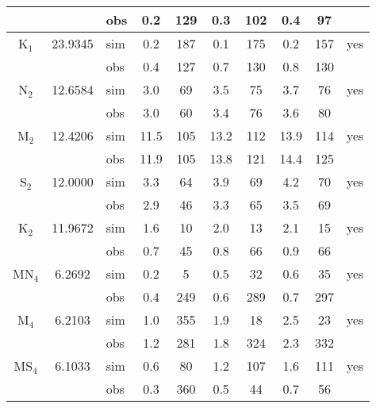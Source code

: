 \begin{table}[htb]
\begin{tabular}{|c|c|l|cc|cc|cc|c|}
\small      &        	     & \small obs & \small 0.2  & \small 129 & \small 0.3  & \small 102 & \small 0.4  & \small 97  &    	\\
\hline
\small K$_1$& \small 23.9345 & \small sim & \small 0.2  & \small 187 & \small 0.1  & \small 175 & \small 0.2  & \small 157 & \small yes	\\
\small      &        	     & \small obs & \small 0.4  & \small 127 & \small 0.7  & \small 130 & \small 0.8  & \small 130 &    	\\
\hline
\small N$_2$& \small 12.6584 & \small sim & \small 3.0  & \small 69  & \small 3.5  & \small 75  & \small 3.7  & \small 76  & \small yes	\\
\small      &        	     & \small obs & \small 3.0  & \small 60  & \small 3.4  & \small 76  & \small 3.6  & \small 80  &    	\\
\hline
\small M$_2$& \small 12.4206 & \small sim & \small 11.5 & \small 105 & \small 13.2 & \small 112 & \small 13.9 & \small 114 & \small yes \\
\small      &        	     & \small obs & \small 11.9 & \small 105 & \small 13.8 & \small 121 & \small 14.4 & \small 125 &    	\\
\hline
\small S$_2$& \small 12.0000 & \small sim & \small 3.3  & \small 64  & \small 3.9  & \small 69  & \small 4.2  & \small 70  & \small yes \\
\small      &        	     & \small obs & \small 2.9  & \small 46  & \small 3.3  & \small 65  & \small 3.5  & \small 69  &    	\\
\hline
\small K$_2$& \small 11.9672 & \small sim & \small 1.6  & \small 10  & \small 2.0  & \small 13  & \small 2.1  & \small 15  & \small yes \\
\small      &        	     & \small obs & \small 0.7  & \small 45  & \small 0.8  & \small 66  & \small 0.9  & \small 66  &    	\\
\hline
\small MN$_4$& \small 6.2692 & \small sim & \small 0.2  & \small 5   & \small 0.5  & \small 32  & \small 0.6  & \small 35  & \small yes	\\
\small      &        	     & \small obs & \small 0.4  & \small 249 & \small 0.6  & \small 289 & \small 0.7  & \small 297 &    	\\
\hline
\small M$_4$& \small 6.2103  & \small sim & \small 1.0  & \small 355 & \small 1.9  & \small 18  & \small 2.5  & \small 23  & \small yes	\\
\small      &        	     & \small obs & \small 1.2  & \small 281 & \small 1.8  & \small 324 & \small 2.3  & \small 332 &    	\\
\hline
\small MS$_4$& \small 6.1033 & \small sim & \small 0.6  & \small 80  & \small 1.2  & \small 107 & \small 1.6  & \small 111 & \small yes	\\
\small      &        	     & \small obs & \small 0.3  & \small 360 & \small 0.5  & \small 44  & \small 0.7  & \small 56  &    	\\
\hline
	\end{tabular}
\end{table}


